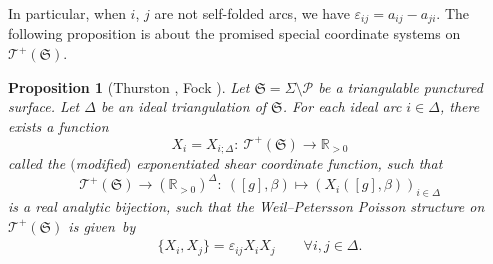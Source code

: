 \documentclass[pdftex]{sigma}
\numberwithin{equation}{section}
\newtheorem{Proposition}[Theorem]{Proposition}
\theoremstyle{definition}
\begin{document}
In particular, when $i$, $j$ are not self-folded arcs, we have $\varepsilon_{ij} = a_{ij} - a_{ji}$.
The following proposition is about the promised special coordinate systems on $\mathscr{T}^+(\mathfrak{S})$.
\begin{Proposition}[Thurston \cite{Thurston86}, Fock \cite{F93}]\label{prop:X_i}
Let $\mathfrak{S} = \Sigma\setminus \mathcal{P}$ be a triangulable punctured surface. Let $\Delta$ be an ideal triangulation of $\mathfrak{S}$. For each ideal arc $i \in \Delta$, there exists a function
\[
X_i = X_{i;\Delta} \colon \ \mathscr{T}^+(\mathfrak{S}) \to \mathbb{R}_{>0}
\]
called the {\em $($modified$)$ exponentiated shear coordinate} function, such that
\[
\mathscr{T}^+(\mathfrak{S}) \to (\mathbb{R}_{>0})^\Delta \colon \ ([g],\beta) \mapsto (X_i([g],\beta))_{i\in \Delta}
\]
is a real analytic bijection, such that the Weil--Petersson Poisson structure on $\mathscr{T}^+(\mathfrak{S})$ is given~by
\begin{align}
\label{eq:Poisson_brackets_of_shear_coordinates}
\{X_i, X_j\} = \varepsilon_{ij} X_i X_j \qquad \forall i,j \in \Delta.
\end{align}
\end{Proposition}
\end{document}
